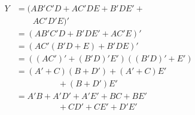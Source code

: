 \documentclass[lang=cn,11pt,a4paper,cite=authoryear,twocolumn]{elegantpaper}
\begin{document}

\[\begin{aligned}
    Y &= (AB'C'D + AC'DE + B'DE' + \\
    &\quad\quad AC'D'E)' \\ 
    &= (AB'C'D + B'DE' + AC'E)' \\
    &= (AC'(B'D + E) + B'DE)' \\ 
    &= ((AC')' + (B'D)' E') ((B'D)' + E') \\
    &= (A'+C)(B+D') + (A'+C)E'\\
    &\quad\quad\quad\quad\quad  + (B+D')E' \\
    &= A'B + A'D' + A'E' + BC + BE' \\
    &\quad\quad\quad\quad\quad + CD'  + CE' + D'E'
\end{aligned}\]


\end{document}

